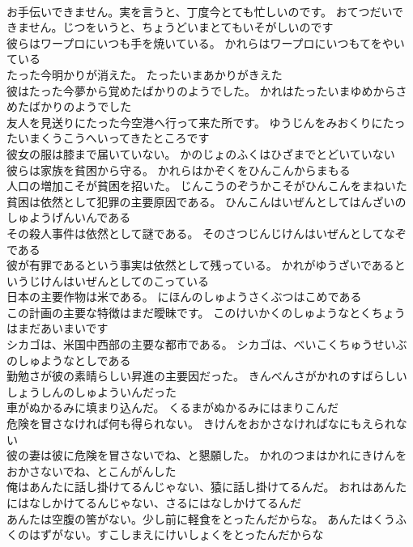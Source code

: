 \documentclass[8pt]{extreport}
\begin{document}
\begin{CJK}{UTF8}{min}
\\	お手伝いできません。実を言うと、丁度今とても忙しいのです。	おてつだいできません。じつをいうと、ちょうどいまとてもいそがしいのです 
\\	彼らはワープロにいつも手を焼いている。	かれらはワープロにいつもてをやいている 
\\	たった今明かりが消えた。	たったいまあかりがきえた 
\\	彼はたった今夢から覚めたばかりのようでした。	かれはたったいまゆめからさめたばかりのようでした 
\\	友人を見送りにたった今空港へ行って来た所です。	ゆうじんをみおくりにたったいまくうこうへいってきたところです 
\\	彼女の服は膝まで届いていない。	かのじょのふくはひざまでとどいていない 
\\	彼らは家族を貧困から守る。	かれらはかぞくをひんこんからまもる 
\\	人口の増加こそが貧困を招いた。	じんこうのぞうかこそがひんこんをまねいた 
\\	貧困は依然として犯罪の主要原因である。	ひんこんはいぜんとしてはんざいのしゅようげんいんである 
\\	その殺人事件は依然として謎である。	そのさつじんじけんはいぜんとしてなぞである 
\\	彼が有罪であるという事実は依然として残っている。	かれがゆうざいであるというじけんはいぜんとしてのこっている 
\\	日本の主要作物は米である。	にほんのしゅようさくぶつはこめである 
\\	この計画の主要な特徴はまだ曖昧です。	このけいかくのしゅようなとくちょうはまだあいまいです 
\\	シカゴは、米国中西部の主要な都市である。	シカゴは、べいこくちゅうせいぶのしゅようなとしである 
\\	勤勉さが彼の素晴らしい昇進の主要因だった。	きんべんさがかれのすばらしいしょうしんのしゅよういんだった 
\\	車がぬかるみに填まり込んだ。	くるまがぬかるみにはまりこんだ 
\\	危険を冒さなければ何も得られない。	きけんをおかさなければなにもえられない 
\\	彼の妻は彼に危険を冒さないでね、と懇願した。	かれのつまはかれにきけんをおかさないでね、とこんがんした 
\\	俺はあんたに話し掛けてるんじゃない、猿に話し掛けてるんだ。	おれはあんたにはなしかけてるんじゃない、さるにはなしかけてるんだ 
\\	あんたは空腹の筈がない。少し前に軽食をとったんだからな。	あんたはくうふくのはずがない。すこしまえにけいしょくをとったんだからな 

\end{CJK}
\end{document}
